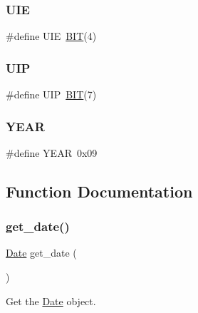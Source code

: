 \subsubsection{\texorpdfstring{U\+IE}{UIE}}
{\footnotesize\ttfamily \#define U\+IE~\mbox{\hyperlink{group__vbe_ga3a8ea58898cb58fc96013383d39f482c}{B\+IT}}(4)}

\mbox{\label{group__rtc_ga3289eebd69837790d4aacaccd18d46db}} 
\subsubsection{\texorpdfstring{U\+IP}{UIP}}
{\footnotesize\ttfamily \#define U\+IP~\mbox{\hyperlink{group__vbe_ga3a8ea58898cb58fc96013383d39f482c}{B\+IT}}(7)}

\mbox{\label{group__rtc_ga5871356500f559add06ea81d60331b1b}} 
\subsubsection{\texorpdfstring{Y\+E\+AR}{YEAR}}
{\footnotesize\ttfamily \#define Y\+E\+AR~0x09}



\subsection{Function Documentation}
\mbox{\label{group__rtc_ga1f2c4f317d879fe00426ee4317bc625f}} 
\subsubsection{\texorpdfstring{get\+\_\+date()}{get\_date()}}
{\footnotesize\ttfamily \mbox{\hyperlink{struct_date}{Date}} get\+\_\+date (\begin{DoxyParamCaption}{ }\end{DoxyParamCaption})}



Get the \mbox{\hyperlink{struct_date}{Date}} object. 

